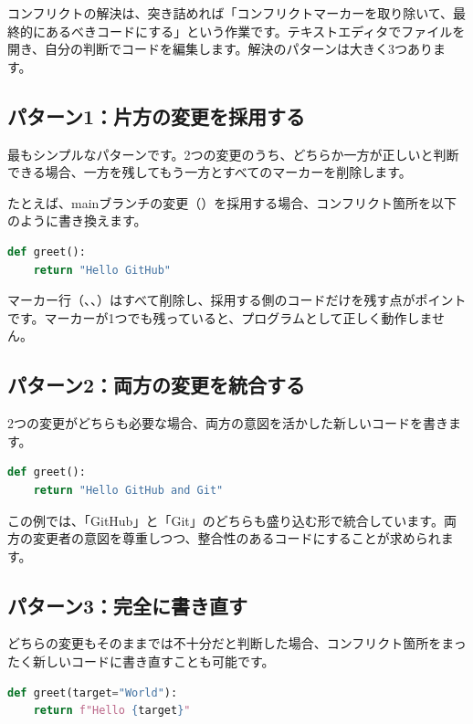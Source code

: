 コンフリクトの解決は、突き詰めれば「コンフリクトマーカーを取り除いて、最終的にあるべきコードにする」という作業です。テキストエディタでファイルを開き、自分の判断でコードを編集します。解決のパターンは大きく3つあります。

\subsection{パターン1：片方の変更を採用する}

最もシンプルなパターンです。2つの変更のうち、どちらか一方が正しいと判断できる場合、一方を残してもう一方とすべてのマーカーを削除します。

たとえば、mainブランチの変更（）を採用する場合、コンフリクト箇所を以下のように書き換えます。

\begin{lstlisting}[language=python]
def greet():
    return "Hello GitHub"
\end{lstlisting}

マーカー行（\cmd{<<<<<<<}、\cmd{=======}、\cmd{>>>>>>>}）はすべて削除し、採用する側のコードだけを残す点がポイントです。マーカーが1つでも残っていると、プログラムとして正しく動作しません。

\subsection{パターン2：両方の変更を統合する}

2つの変更がどちらも必要な場合、両方の意図を活かした新しいコードを書きます。

\begin{lstlisting}[language=python]
def greet():
    return "Hello GitHub and Git"
\end{lstlisting}

この例では、「GitHub」と「Git」のどちらも盛り込む形で統合しています。両方の変更者の意図を尊重しつつ、整合性のあるコードにすることが求められます。

\subsection{パターン3：完全に書き直す}

どちらの変更もそのままでは不十分だと判断した場合、コンフリクト箇所をまったく新しいコードに書き直すことも可能です。

\begin{lstlisting}[language=python]
def greet(target="World"):
    return f"Hello {target}"
\end{lstlisting}


